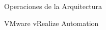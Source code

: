 \begin{subsection}{Operaciones de la Arquitectura}
\begin{subsubsection}{VMware vRealize Automation}

\end{subsubsection}
\end{subsection}
